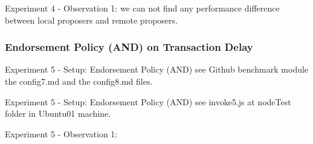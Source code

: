 \documentclass[10pt,journal,compsoc, twoside]{IEEEtran}
\begin{document}
Experiment 4 - Observation 1: we can not find any performance difference between local proposers and remote proposers.










\subsubsection{Endorsement Policy (AND) on Transaction Delay}

Experiment 5 - Setup: Endorsement Policy (AND) see Github benchmark module the config7.md and the config8.md files.

Experiment 5 - Setup: Endorsement Policy (AND) see invoke5.js at nodeTest folder in Ubuntu01 machine.





Experiment 5 - Observation 1:










%

















%
%
%
%
\end{document}
